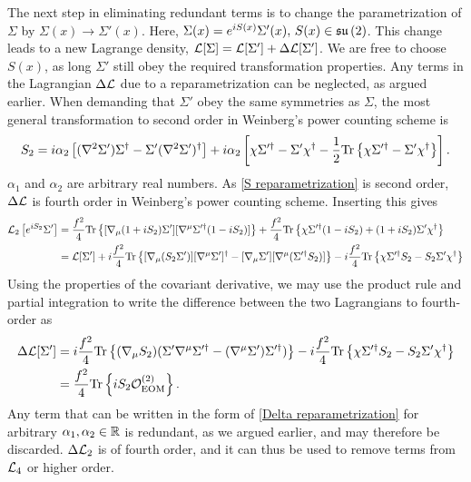 The next step in eliminating redundant terms is to change the parametrization of $\Sigma$ by $\Sigma(x) \rightarrow \Sigma'(x)$.
Here, $ \Sigma(x) = e^{iS(x)} \Sigma'(x), \, S(x) \in \mathfrak{su}\left(2\right)$. This change leads to a new Lagrange density, $\mathcal{L}[\Sigma] = \mathcal{L}[\Sigma'] + \Delta \mathcal{L}[\Sigma']$.
We are free to choose $S(x)$, as long $\Sigma'$ still obey the required transformation properties.
Any terms in the Lagrangian $\Delta \mathcal{L}$ due to a reparametrization can be neglected, as argued earlier.
When demanding that $\Sigma'$ obey the same symmetries as $\Sigma$,
the most general transformation to second order in Weinberg's power counting scheme  is~\cite{schererIntroductionChiralPerturbation2002}
%
\begin{equation}
    \label{S reparametrization}
    S_{2} = 
    i \alpha_2 
    \left[
        (\nabla^2 \Sigma') \Sigma^\dagger - \Sigma' (\nabla^2 {\Sigma'})^\dagger
    \right]
    + i \alpha_2
    \left[
        \chi \Sigma'^\dagger - \Sigma' \chi^\dagger 
        - \frac{1}{2} \text{Tr} \left\{ \chi \Sigma'^\dagger - \Sigma' \chi^\dagger \right\}
    \right].
\end{equation}
%
$\alpha_1$ and $\alpha_2$ are arbitrary real numbers. As \autoref{S reparametrization} is second order, $\Delta \mathcal{L}$ is fourth order in Weinberg's power counting scheme.
Inserting this gives
%
\begin{align*}
    \mathcal{L}_2\left[e^{i S_2}\Sigma '\right]
    & =
    \frac{f^2}{4}\text{Tr} \left\{ [\nabla_\mu (1 +i S_2)\Sigma'][\nabla^\mu \Sigma'^\dagger  (1 - i S_2)] \right\}
    + \frac{f^2}{4} \text{Tr} \left\{ \chi\Sigma'^\dagger (1 - i S_2) + (1 +i S_2)\Sigma' \chi^\dagger \right\} \\
    & = \mathcal{L}[\Sigma'] + 
    i \frac{f^2}{4}
    \text{Tr} \left\{ [\nabla_\mu (S_2\Sigma')][\nabla^\mu\Sigma']^\dagger 
    -  [\nabla_\mu\Sigma'][\nabla^\mu (\Sigma'^\dagger  S_2) ] \right\}
    - i \frac{f^2}{4} \text{Tr} \left\{ \chi \Sigma'^\dagger S_2 - S_2 \Sigma' \chi^\dagger \right\}
\end{align*}
%
Using the properties of the covariant derivative, we may use the product rule and partial integration to write the difference between the two Lagrangians to fourth-order as
%
\begin{align}
    \nonumber
    \Delta \mathcal{L}[\Sigma'] 
    & = 
    i \frac{f^2}{4}
    \text{Tr} \left\{ 
        (\nabla_\mu S_2)
        (\Sigma' \nabla^\mu \Sigma'^\dagger - (\nabla^\mu \Sigma') \Sigma'^\dagger) 
     \right\}
    - i \frac{f^2}{4} \text{Tr} \left\{ \chi \Sigma'^\dagger  S_2 - S_2 \Sigma' \chi^\dagger \right\} \\
    & = 
    \label{Delta reparametrization}
    \frac{f^2}{4} \text{Tr} \left\{ i S_2 \mathcal{O}_\mathrm{EOM}^{(2)} \right\}.
\end{align}
%
Any term that can be written in the form of \autoref{Delta reparametrization} for arbitrary $\alpha_1, \alpha_2 \in \mathbb{R}$ is redundant, as we argued earlier, and may therefore be discarded.
$\Delta \mathcal{L}_2$ is of fourth order, and it can thus be used to remove terms from $\mathcal{L}_4$ or higher order.



